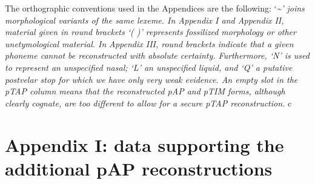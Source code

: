 \addtocounter{footnote}{-2}

The orthographic conventions used in the Appendices are the following: `\emph{\textup{\~{}' joins morphological variants of the same lexeme. In Appendix I and Appendix II, material given in round brackets `( )' represents fossilized morphology or other unetymological material. In }}\emph{\textup{Appendix III, round brackets indicate that a given phoneme cannot be reconstructed with absolute certainty. Furthermore, `N' is used to represent an unspecified nasal; `L' an unspecified liquid, and `Q' a putative postvelar stop for which we have only very weak evidence. An empty slot in the pTAP column means that the reconstructed pAP and pTIM forms, although clearly cognate, are too different to allow for a secure pTAP reconstruction. }} c

\clearpage
\section{Appendix I: data supporting the additional pAP reconstructions}

